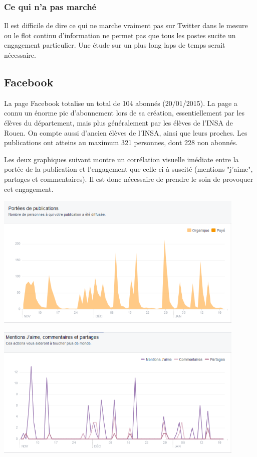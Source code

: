 \subsubsection{Ce qui n'a pas marché}
Il est difficile de dire ce qui ne marche vraiment pas sur Twitter dans le mesure ou le flot continu d'information ne permet pas que tous les postes sucite un engagement particulier. Une étude sur un plus long laps de temps serait nécessaire.
\subsection{Facebook}

La page Facebook totalise un total de 104 abonnés (20/01/2015). La page a connu un énorme pic d'abonnement lors de sa création, essentiellement par les élèves du département, mais plus généralement par les élèves de l'INSA de Rouen. On compte aussi d'ancien élèves de l'INSA, ainsi que leurs proches. Les publications ont atteins au maximum 321 personnes, dont 228 non abonnés.

Les deux graphiques suivant montre un corrélation visuelle imédiate entre la portée de la publication et l'engagement que celle-ci à suscité (mentions "j'aime", partages et commentaires). Il est donc nécessaire de prendre le soin de provoquer cet engagement. 
\begin{center}
\includegraphics[width=0.90\textwidth]{images/PorteeDesPublication.png}
\end{center}


\begin{center}
\includegraphics[width=0.90\textwidth]{images/Engagements.png}
\end{center}

